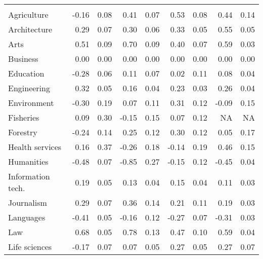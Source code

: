 \begin{longtable}[t]{lrrrrrrrr}
\endfoot
\bottomrule
\endlastfoot
\addlinespace[0.3em]
\multicolumn{9}{l}{\textit{\textbf{Panel A: }}}\\
\hspace{1em}Agriculture & -0.16 & 0.08 & 0.41 & 0.07 & 0.53 & 0.08 & 0.44 & 0.14\\
\hspace{1em}Architecture & 0.29 & 0.07 & 0.30 & 0.06 & 0.33 & 0.05 & 0.55 & 0.05\\
\hspace{1em}Arts & 0.51 & 0.09 & 0.70 & 0.09 & 0.40 & 0.07 & 0.59 & 0.03\\
\hspace{1em}Business & 0.00 & 0.00 & 0.00 & 0.00 & 0.00 & 0.00 & 0.00 & 0.00\\
\hspace{1em}Education & -0.28 & 0.06 & 0.11 & 0.07 & 0.02 & 0.11 & 0.08 & 0.04\\
\hspace{1em}Engineering & 0.32 & 0.05 & 0.16 & 0.04 & 0.23 & 0.03 & 0.26 & 0.04\\
\hspace{1em}Environment & -0.30 & 0.19 & 0.07 & 0.11 & 0.31 & 0.12 & -0.09 & 0.15\\
\hspace{1em}Fisheries & 0.09 & 0.30 & -0.15 & 0.15 & 0.07 & 0.12 & NA & NA\\
\hspace{1em}Forestry & -0.24 & 0.14 & 0.25 & 0.12 & 0.30 & 0.12 & 0.05 & 0.17\\
\hspace{1em}Health services & 0.16 & 0.37 & -0.26 & 0.18 & -0.14 & 0.19 & 0.46 & 0.15\\
\hspace{1em}Humanities & -0.48 & 0.07 & -0.85 & 0.27 & -0.15 & 0.12 & -0.45 & 0.04\\
\hspace{1em}Information tech. & 0.19 & 0.05 & 0.13 & 0.04 & 0.15 & 0.04 & 0.11 & 0.03\\
\hspace{1em}Journalism & 0.29 & 0.07 & 0.36 & 0.14 & 0.21 & 0.11 & 0.19 & 0.03\\
\hspace{1em}Languages & -0.41 & 0.05 & -0.16 & 0.12 & -0.27 & 0.07 & -0.31 & 0.03\\
\hspace{1em}Law & 0.68 & 0.05 & 0.78 & 0.13 & 0.47 & 0.10 & 0.59 & 0.04\\
\hspace{1em}Life sciences & -0.17 & 0.07 & 0.07 & 0.05 & 0.27 & 0.05 & 0.27 & 0.07\\

\end{longtable}
